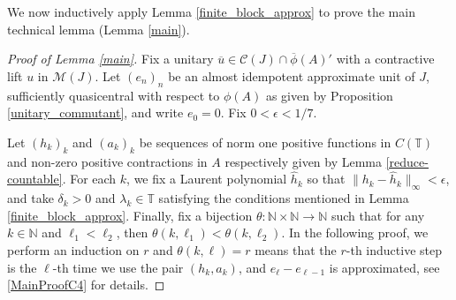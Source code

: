 \documentclass[reqno]{amsart}
\theoremstyle{definition}
\theoremstyle{remark}
\numberwithin{equation}{section}
\theoremstyle{definition}
\newcommand{\calC}{\mathcal{C}}
\newcommand{\calM}{\mathcal{M}}
\begin{document}
We now inductively apply Lemma \ref{finite_block_approx} to prove the main technical lemma (Lemma \ref{main}). 

\begin{proof}[Proof of Lemma \ref{main}]
Fix a unitary $\overline{u}\in \calC(J)\cap \overline{\phi}(A)'$ with a contractive lift $u$ in $\calM(J)$. Let $(e_n)_{n}$ be an almost idempotent approximate unit of $J$, sufficiently quasicentral with respect to $\phi(A)$ as given by Proposition \ref{unitary_commutant}, and write $e_0=0$. Fix $0< \epsilon < 1/7$. 

Let $(h_k)_{k}$ and $(a_k)_{k}$ be sequences of norm one positive functions in $C(\mathbb T)$ and non-zero positive contractions in $A$ respectively given by Lemma \ref{reduce-countable}. For each $k$, we fix a Laurent polynomial $\hat{h}_{k}$ so that $\|h_{k} - \hat{h}_{k}\|_{\infty} < \epsilon$, and take $\delta_{k}>0$ and $\lambda_{k}\in \mathbb{T}$ satisfying the conditions mentioned in Lemma \ref{finite_block_approx}. Finally, fix a bijection $\theta\colon\mathbb N\times \mathbb{N}\to\mathbb N$ such that for any $k\in \mathbb{N}$ and $\ell_{1}<\ell_{2}$, then $\theta(k, \ell_{1}) < \theta(k, \ell_{2})$. In the following proof, we perform an induction on $r$ and $\theta(k, \ell) = r$ means that the $r$-th inductive step is the $\ell$-th time we use the pair $(h_{k}, a_{k})$, and $e_{\ell} - e_{\ell-1}$ is approximated, see \eqref{MainProofC4} for details.


\end{proof}
\end{document}

